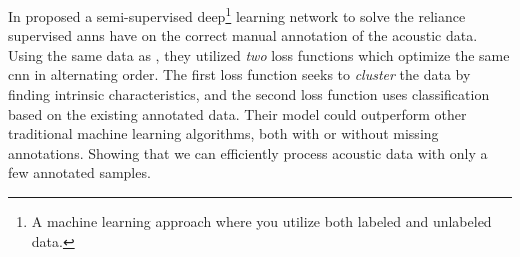 In \citeyear{semtantic-segm2021choi} \citet{semtantic-segm2021choi} proposed  a semi-supervised deep\footnote{A machine learning approach where you utilize both labeled and unlabeled data\cite{Goodfellow-et-al-2016}.} learning network to solve the reliance supervised \gls{ann}s have on the correct manual annotation of the acoustic data. Using the same data as \citet{brautaset2020acoustic}, they utilized \textit{two} loss functions which optimize the same \gls{cnn} in alternating order. The first loss function seeks to \textit{cluster} the data by finding intrinsic characteristics, and the second loss function uses classification based on the existing annotated data. Their model could outperform other traditional machine learning algorithms, both with or without missing annotations. Showing that we can efficiently process acoustic data with only a few annotated samples.




%        









        
        
        
        
        

        
        
        
        
        
        
 


